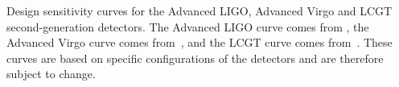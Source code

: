 \label{fig:advcurves}
Design sensitivity curves for the Advanced LIGO, Advanced Virgo
and LCGT second-generation detectors. The Advanced LIGO curve comes from
\cite{Harry:2010}, the Advanced Virgo curve comes
from~\cite{AdvVirgoweb}, and the LCGT curve comes
from~\cite{Arai:2009}. These curves are based on specific
configurations of the detectors and are therefore subject to change.
